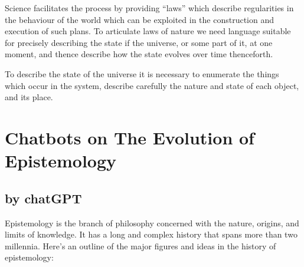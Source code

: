 \documentclass[10pt,titlepage]{book}
\begin{document}
Science facilitates the process by providing ``laws'' which describe regularities in the behaviour of the world which can be exploited in the construction and execution of such plans.
To articulate laws of nature we need language suitable for precisely describing the state if the universe, or some part of it, at one moment, and thence describe how the state evolves over time thenceforth.

To describe the state of the universe it is necessary to enumerate the things which occur in the system, describe carefully the nature and state of each object, and its place.

\chapter{Chatbots on The Evolution of Epistemology}

\section{by chatGPT}

Epistemology is the branch of philosophy concerned with the nature, origins, and limits of knowledge. It has a long and complex history that spans more than two millennia. Here's an outline of the major figures and ideas in the history of epistemology:
\end{document}
